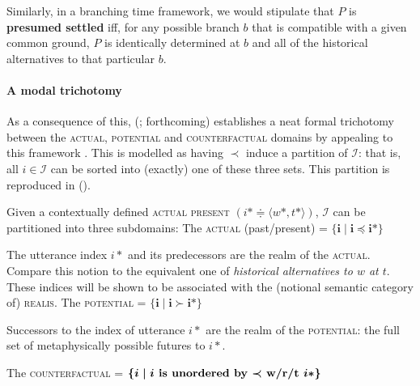 \documentclass[12pt,dvipsnames]{report}
\begin{document}
\xe

\noindent Similarly, in a branching time framework, we would stipulate that $ P $ is \textbf{presumed settled} iff, for any possible branch $ b $ that is compatible with a given common ground, $ P $ is identically determined at $ b $ and all of the historical alternatives to that particular $ b $.



\paragraph{A modal trichotomy}\label{vP-trich} As a consequence of this,  \citeauthor{VonPrince2017a} (\citeyear{VonPrince2017a,VonPrince2019}; \citealp{VonPrincea} forthcoming) establishes a neat formal trichotomy between the \textsc{actual, potential} and \textsc{counterfactual} domains by appealing to this framework \citetext{\citealp[see also][41]{Rumberg2016a}, \citeyear{Rumberg2019}}. This is modelled as having $ \boldsymbol{\prec} $ induce a partition of $ \mathcal I $: that is, all $ i\in\mathcal I $ can be sorted into (exactly) one of these three sets. This partition is reproduced in ().

\pex Given a contextually defined \textsc{actual present} $( i*\doteqdot\langle w*,t*\rangle )$, $ \mathcal I $ can be partitioned into three subdomains:
\a The \textsc{actual} (past/present) = $\boldsymbol{ \{i\mid i\preccurlyeq i*\} }$

The utterance index $ i* $ and its predecessors are the realm of the \textsc{actual}.
Compare this notion to the equivalent one of \textit{historical alternatives to $ w $ at $ t $}. These indices will be shown to be associated with the (notional semantic category of) \textsc{realis}.
\a The \textsc{potential} = $ \boldsymbol{\{i\mid i\succ i*\} }$

Successors to the index of utterance $ i* $ are the realm of the \textsc{potential}: the full set of metaphysically possible futures to $ i* $.

\a The \textsc{counterfactual} = $\boldsymbol{ \{i\mid i \textbf{ is unordered by $ \boldsymbol\prec $ w/r/t } i* \}}$
\end{document}
